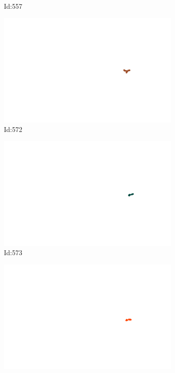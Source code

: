 \documentclass[12pt,twoside]{report}
\begin{document}
\begin{figure}
\begin{subfigure}[b]{0.20\textwidth}
\caption{Id:557}
\end{subfigure}
\begin{subfigure}[b]{0.20\textwidth}
\centering
\includegraphics[width=\textwidth]{../../trajectories/572.png}
\caption{Id:572}
\end{subfigure}
\begin{subfigure}[b]{0.20\textwidth}
\centering
\includegraphics[width=\textwidth]{../../trajectories/573.png}
\caption{Id:573}
\end{subfigure}
\begin{subfigure}[b]{0.20\textwidth}
\centering
\includegraphics[width=\textwidth]{../../trajectories/695.png}

\end{subfigure}
\end{figure}
\end{document}
